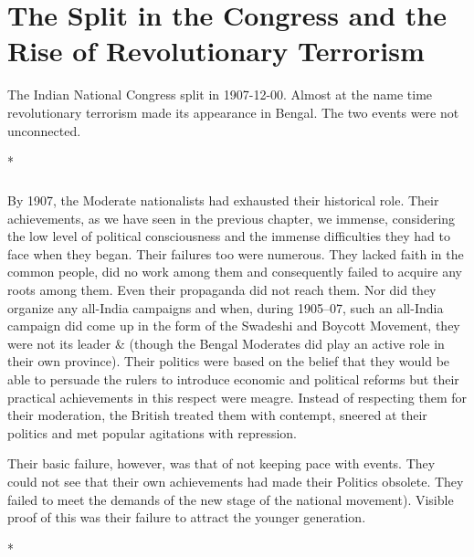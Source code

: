 \chapter[Split in the Congress and Revolutionary Terrorism]{The Split in the Congress and the Rise of Revolutionary Terrorism}

The Indian National Congress split in 1907-12-00. Almost at the name time revolutionary terrorism made its appearance in Bengal. The two events were not unconnected.

\begin{center}*\end{center}

\paragraph*{}

By 1907, the Moderate nationalists had exhausted their historical role. Their achievements, as we have seen in the previous chapter, we immense, considering the low level of political consciousness and the immense difficulties they had to face when they began. Their failures too were numerous. They lacked faith in the common people, did no work among them and consequently failed to acquire any roots among them. Even their propaganda did not reach them. Nor did they organize any all-India campaigns and when, during 1905--07, such an all-India campaign did come up in the form of the Swadeshi and Boycott Movement, they were not its leader \& (though the Bengal Moderates did play an active role in their own province). Their politics were based on the belief that they would be able to persuade the rulers to introduce economic and political reforms but their practical achievements in this respect were meagre. Instead of respecting them for their moderation, the British treated them with contempt, sneered at their politics and met popular agitations with repression.

Their basic failure, however, was that of not keeping pace with events. They could not see that their own achievements had made their Politics obsolete. They failed to meet the demands of the new stage of the national movement). Visible proof of this was their failure to attract the younger generation.

\begin{center}*\end{center}

\paragraph*{}

